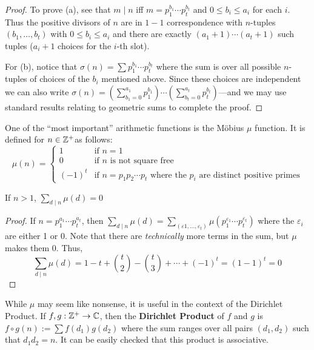 \begin{proof}
  To prove (a), see that \(m\mid n\) iff \(m=p_1^{b_{1}}\cdots p_t^{b_t}\) and
  \(0\leq b_i\leq a_i\) for each \(i\). Thus the positive divisors of \(n\) are
  in \(1-1\) correspondence with \(n\)-tuples \((b_1, \dots, b_t)\) with
  \(0\leq b_i\leq a_i\) and there are exactly \((a_1+1)\cdots(a_t+1)\) such
  tuples (\(a_i+1\) choices for the \(i\)-th slot).

  For (b), notice that \(\sigma(n)= \sum p_1^{b_{1}}\cdots p_t^{b_t}\) where the
  sum is over all possible \(n\)-tuples of choices of the \(b_i\) mentioned
  above. Since these choices are independent we can also write
  \(\sigma(n) = \left( \sum_{b_1=0}^{a_1}p_1^{b_1} \right) \cdots \left( \sum_{b_t=0}^{a_t}p_t^{b_t} \right) \)---and
  we may use standard results relating to geometric sums to complete the proof.
\end{proof}

One of the ``most important'' arithmetic functions is the M\"obius \(\mu\)
function. It is defined for \(n \in \mathbb{Z} ^+\)as follows:
\[
  \mu(n) =
  \begin{cases}
    1 & \text{if \(n = 1\)}\\
    0 & \text{if \(n\) is not square free}\\
    {(-1)}^t & \text{if \(n=p_1p_2\cdots p_t\) where the \(p_i\) are distinct
      positive primes}
  \end{cases}
\]

\begin{prop}
  If \(n>1\), \(\sum_{d\mid n} \mu(d)=0\)
\end{prop}
\begin{proof}
  If \(n=p_1^{a_{1}}\cdots p_t^{a_t}\), then
  \(\sum_{d\mid n}\mu(d)= \sum_{(\varepsilon1, \dots ,\varepsilon_t)} \mu(p_1^{\varepsilon_1}\cdots p_t^{\varepsilon_t})\)
  where the \(\varepsilon_i\) are either 1 or 0. Note that there are
  \emph{technically} more terms in the sum, but \(\mu\) makes them 0. Thus,
  \[
    \sum_{d\mid n}\mu(d) = 1-t + \binom{t}{2} - \binom{t}{3} +\cdots+(-1)^t = (1-1)^t=0
  \]
\end{proof}

While \(\mu\) may seem like nonsense, it is useful in the context of the
Dirichlet Product. If \(f,g:\mathbb{Z} ^+ \to \mathbb{C} \), then the \textbf{Dirichlet
  Product}
of \(f\) and \(g\) is \(f\circ g(n) := \sum f(d_1)g(d_2)\) where the sum ranges
over all pairs \((d_1,d_2)\) such that \(d_1d_2=n\). It can be easily checked
that this product is associative.

